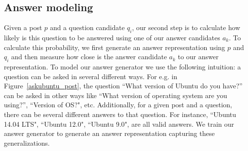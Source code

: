 \documentclass[11pt]{report}
\begin{document}
\subsection{Answer modeling}\label{answer_modeling}

Given a post $p$ and a question candidate $q_i$, our second step is to calculate how likely is this question to be answered using one of our answer candidates $a_k$. To calculate this probability, we first generate an answer representation using $p$ and $q_i$ and then measure how close is the answer candidate $a_k$ to our answer representation. To model our answer generator we use the following intuition: a question can be asked in several different ways. For e.g. in Figure~\ref{askubuntu_post}, the question ``\textsf{\small What version of Ubuntu do you have?}'' can be asked in other ways like ``\textsf{\small What version of operating system are you using?}'', ``\textsf{\small Version of OS?}", etc.  
Additionally, for a given post and a question, there can be several different answers to that question. For instance, ``\textsf{\small Ubuntu 14.04 LTS}", ``\textsf{\small Ubuntu 12.0}", ``\textsf{\small Ubuntu 9.0}", are all valid answers. We train our answer generator to generate an answer representation capturing these generalizations.
\end{document}
